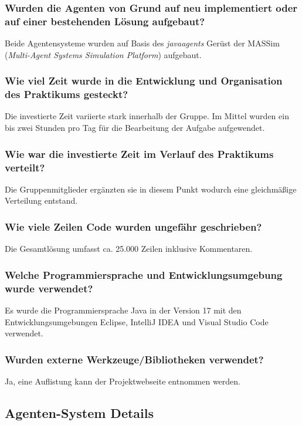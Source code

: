 \documentclass[runningheads]{llncs}
\begin{document}
\subsubsection{Wurden die Agenten von Grund auf neu implementiert oder auf einer bestehenden Lösung aufgebaut?\\}
Beide Agentensysteme wurden auf Basis des \textit{javaagents} Gerüst der MASSim (\textit{Multi-Agent Systems Simulation Platform}) aufgebaut.
\subsubsection{Wie viel Zeit wurde in die Entwicklung und Organisation des Praktikums gesteckt?\\}
Die investierte Zeit variierte stark innerhalb der Gruppe. Im Mittel wurden ein bis zwei Stunden pro Tag für die Bearbeitung der Aufgabe aufgewendet.
\subsubsection{Wie war die investierte Zeit im Verlauf des Praktikums verteilt?\\}
Die Gruppenmitglieder ergänzten sie in diesem Punkt wodurch eine gleichmäßige Verteilung entstand.
\subsubsection{Wie viele Zeilen Code wurden ungefähr geschrieben?\\}
Die Gesamtlösung umfasst ca. 25.000 Zeilen inklusive Kommentaren.
\subsubsection{Welche Programmiersprache und Entwicklungsumgebung wurde verwendet?\\}
Es wurde die Programmiersprache Java in der Version 17 mit den Entwicklungsumgebungen Eclipse, IntelliJ IDEA und Visual Studio Code verwendet.
\subsubsection{Wurden externe Werkzeuge/Bibliotheken verwendet?\\}
Ja, eine Auflistung kann der Projektwebseite \cite{Site} entnommen werden.
\subsection{Agenten-System Details}
\end{document}
